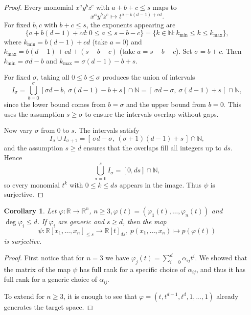 \documentclass[11pt,a4paper]{amsart}
\numberwithin{equation}{section}
\newtheorem{cor}[thm]{Corollary}
\theoremstyle{definition}
\newcommand{\N}{\mathbb{N}}
\newcommand{\R}{\mathbb{R}}
\numberwithin{thm}{section}
\theoremstyle{break}
\numberwithin{subcase}{case}
\begin{document}
\begin{proof}
Every monomial $x^a y^b z^c$ with $a+b+c \le s$ maps to  
\[
x^a y^b z^c \longmapsto t^{a + b(d-1)+ c d}.
\]
For fixed $b,c$ with $b+c \le s$, the exponents appearing are
\[
\{a + b(d-1)+ c d : 0 \le a \le s-b-c \}
= \{k \in \N : k_{\min} \le k \le k_{\max}\},
\]
where $k_{\min} = b(d-1)+cd$ (take $a=0$) and $k_{\max}=b(d-1)+cd + (s-b-c)$ (take $a=s-b-c$).  
Set $\sigma=b+c$. Then $k_{\min} = \sigma d - b$ and $k_{\max} = \sigma(d-1)-b+s$.  

For fixed $\sigma$, taking all $0 \le b \le \sigma$ produces the union of intervals
\[
I_\sigma = \bigcup_{b=0}^\sigma [\sigma d-b,\ \sigma(d-1)-b+s]\cap\N
= [\,\sigma d - \sigma,\ \sigma(d-1)+s\,]\cap \N,
\]
since the lower bound comes from $b=\sigma$ and the upper bound from $b=0$.  
This uses the assumption $s \ge \sigma$ to ensure the intervals overlap without gaps.

Now vary $\sigma$ from $0$ to $s$.  
The intervals satisfy  
\[
I_\sigma \cup I_{\sigma+1} 
= [\,\sigma d - \sigma,\ (\sigma+1)(d-1)+s\,]\cap \N,
\]
and the assumption $s \ge d$ ensures that the overlaps fill all integers up to $ds$.  
Hence
\[
\bigcup_{\sigma=0}^s I_\sigma = [0, ds]\cap \N,
\]
so every monomial $t^k$ with $0 \le k \le ds$ appears in the image.  
Thus $\psi$ is surjective.
\end{proof}

\begin{cor}\label{cor:surjective}
    Let $\varphi:\R\to \R^n$, {$n\ge 3$}$, \varphi(t)=(\varphi_1(t),\dots,\varphi_n(t))$ and $\deg \varphi_i\leq d$. If $\varphi_i$ are generic and $s\geq d$, then the map $$\psi:\R[x_1,\dots,x_n]_{\leq s}\to \R[t]_{ds},\ p(x_1,\dots,x_n)\mapsto p(\varphi(t))
    $$
    is surjective.
\end{cor}
\begin{proof}
    First notice that for $n=3$ we have $\varphi_j(t)=\sum_{i=0}^d\alpha_{ij}t^i$. We showed that the matrix of the map $\psi$ has full rank for a specific choice of $\alpha_{ij}$, and thus it has full rank for a generic choice of $\alpha_{ij}$.

    To extend for $n\geq 3$, it is enough to see that $\varphi=(t,t^{d-1},t^d,1,\dots,1)$ already generates the target space.
\end{proof}
\end{document}
